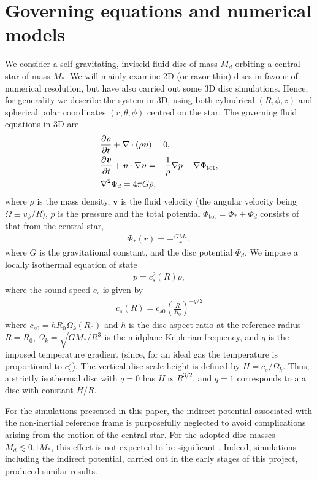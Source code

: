 \section{Governing equations and numerical models}\label{model} 
We consider a self-gravitating, inviscid fluid disc of mass $M_d$ 
orbiting a central star of mass $M_*$. We will mainly examine 2D
(or razor-thin) discs in favour of numerical 
resolution, but have also carried out some 3D disc
simulations. Hence, for generality we describe the system in
3D, using both cylindrical $(R,\phi,z)$ and spherical polar
coordinates $(r,\theta,\phi)$ centred on the star. 
The governing fluid equations in 3D are  
\begin{align}
  &\frac{\partial\rho}{\partial t} + \nabla\cdot\left(\rho\bm{v}\right) =
  0,\label{cont_eq}\\
  &\frac{\partial\bm{v}}{\partial t} + \bm{v}\cdot\nabla\bm{v} = -\frac{1}{\rho}\nabla
  p -\nabla \Phi_\mathrm{tot}\label{mom_eq},\\ 
  & \nabla^2\Phi_d = 4 \pi G \rho \label{poisson}, 
\end{align}
where $\rho$ is the mass density, $\bm{v}$ is the 
fluid velocity (the angular velocity being $\Omega \equiv v_\phi/R$), 
$p$ is the pressure and the total potential
$\Phi_\mathrm{tot} = \Phi_* + \Phi_d$ consists of that from the
central star, 
\begin{align}
  \Phi_*(r) = -\frac{GM_*}{r}, 
\end{align}
where $G$ is the gravitational constant,  and the disc potential
$\Phi_d$. We impose a locally isothermal equation of state 
\begin{align}
  p = c_s^2(R)\rho,
\end{align}
where the sound-speed $c_s$ is given by 
\begin{align}\label{sound-speed}
  c_s(R) = c_{s0}\left(\frac{R}{R_0}\right)^{-q/2}
\end{align}
where $c_{s0} = h R_0\Omega_k(R_0)$ and 
$h$ is the disc aspect-ratio at the reference radius $R=R_0$, 
$\Omega_k=\sqrt{GM_*/R^3}$ is the midplane Keplerian frequency, and
$q$ is the imposed temperature gradient (since, for an ideal gas the
temperature is proportional to $c_s^2$). The vertical disc scale-height is
defined by $H=c_s/\Omega_k$. Thus, a strictly isothermal disc with
$q=0$ has $H\propto R^{3/2}$, and $q=1$ corresponds to a 
a disc with constant $H/R$. 

For the simulations presented in this paper, the indirect potential
associated with the non-inertial reference frame is purposefully 
neglected to avoid complications arising from the motion of the
central star. For the adopted disc masses $M_d\lesssim 0.1 M_*$, this
effect is not expected to be significant
\citep{adams89,shu90,michael10}. Indeed, simulations including the indirect
potential, carried out in the early stages of this project, produced
similar results.    

